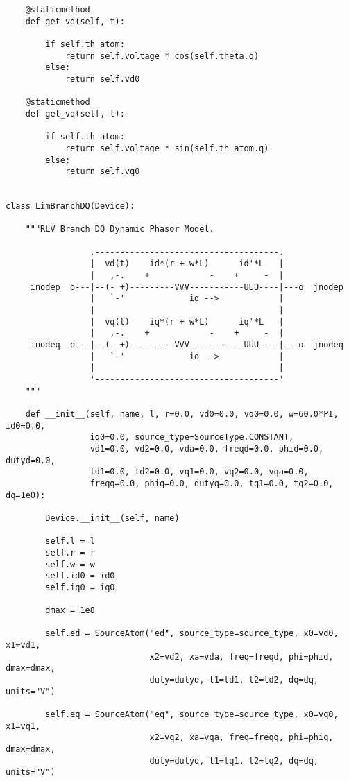 \begin{lstlisting}
    @staticmethod
    def get_vd(self, t):

        if self.th_atom:
            return self.voltage * cos(self.theta.q)
        else:
            return self.vd0

    @staticmethod
    def get_vq(self, t):

        if self.th_atom:
            return self.voltage * sin(self.th_atom.q)
        else:
            return self.vq0


class LimBranchDQ(Device):

    """RLV Branch DQ Dynamic Phasor Model.

                 .-------------------------------------.
                 |  vd(t)    id*(r + w*L)      id'*L   |
                 |   ,-.    +            -    +     -  |
     inodep  o---|--(- +)---------VVV-----------UUU----|---o  jnodep
                 |   `-'             id -->            |
                 |                                     |
                 |  vq(t)    iq*(r + w*L)      iq'*L   |
                 |   ,-.    +            -    +     -  |
     inodeq  o---|--(- +)---------VVV-----------UUU----|---o  jnodeq
                 |   `-'             iq -->            |
                 |                                     |
                 '-------------------------------------'
    """

    def __init__(self, name, l, r=0.0, vd0=0.0, vq0=0.0, w=60.0*PI, id0=0.0,
                 iq0=0.0, source_type=SourceType.CONSTANT,
                 vd1=0.0, vd2=0.0, vda=0.0, freqd=0.0, phid=0.0, dutyd=0.0,
                 td1=0.0, td2=0.0, vq1=0.0, vq2=0.0, vqa=0.0,
                 freqq=0.0, phiq=0.0, dutyq=0.0, tq1=0.0, tq2=0.0, dq=1e0):

        Device.__init__(self, name)

        self.l = l
        self.r = r
        self.w = w
        self.id0 = id0
        self.iq0 = iq0

        dmax = 1e8

        self.ed = SourceAtom("ed", source_type=source_type, x0=vd0, x1=vd1,
                             x2=vd2, xa=vda, freq=freqd, phi=phid, dmax=dmax,
                             duty=dutyd, t1=td1, t2=td2, dq=dq, units="V")

        self.eq = SourceAtom("eq", source_type=source_type, x0=vq0, x1=vq1,
                             x2=vq2, xa=vqa, freq=freqq, phi=phiq, dmax=dmax,
                             duty=dutyq, t1=tq1, t2=tq2, dq=dq, units="V")


\end{lstlisting}
